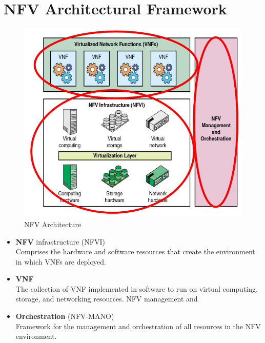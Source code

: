 \section{NFV Architectural Framework}
\begin{figure}[htbp]
   \centering
   \includegraphics{images/NFV_architecture.png}
   \caption{NFV Architecture}
   \label{fig:NFV_architecture}
\end{figure}

\begin{itemize}
   \item \textbf{NFV} infrastructure (NFVI)\\
   Comprises the hardware and
   software resources that create
   the environment in which VNFs
   are deployed.
   \item \textbf{VNF}\\ 
   The collection of VNF
   implemented in software to run
   on virtual computing, storage,
   and networking resources.
   NFV management and
   \item \textbf{Orchestration} (NFV-MANO)\\
   Framework for the management
   and orchestration of all
   resources in the NFV
   environment.
\end{itemize}

